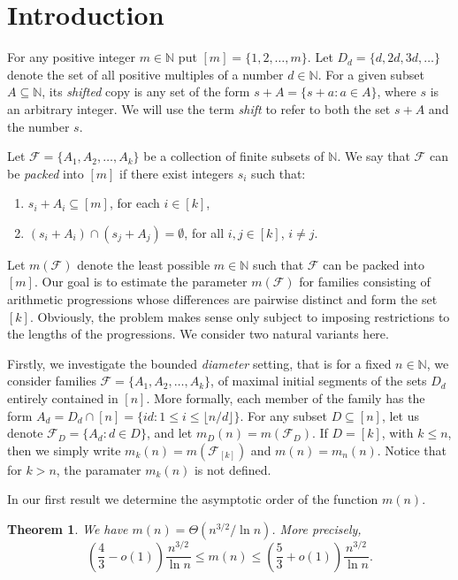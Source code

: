 \documentclass[12pt]{amsart}
\newtheorem{theorem}{Theorem}
\theoremstyle{plain}
\numberwithin{equation}{section}
\begin{document}
	
	\section{Introduction}
For any positive integer $m\in \mathbb{N}$ 
put $[m]=\{1,2,\ldots,m\}$. Let $D_d=\{d,2d,3d,\ldots\}$ denote the set of all positive multiples of a number $d\in \mathbb{N}$. For a given subset $A\subseteq \mathbb{N}$, its \emph{shifted} copy 
is any set of the form $s+A=\{s+a:a\in A\}$, where $s$ is an arbitrary integer. We will use the term \emph{shift} to refer to both the set $s+A$ and the number $s$.

Let $\mathcal{F}=\{A_1,A_2,\ldots,A_k\}$ be a collection of finite subsets of $\mathbb{N}$. We say that $\mathcal{F}$ can be \emph{packed} into $[m]$ if there exist integers $s_i$ such that:
\begin{enumerate}
	\item [(1)]$s_i+A_i\subseteq [m]$, for each $i \in [k]$,
	\item [(2)] $(s_i+A_i)\cap (s_j+A_j)=\emptyset$, for all $i,j \in [k]$, $i\neq j$.
\end{enumerate}

Let $m(\mathcal{F})$ denote the least possible $m\in \mathbb{N}$ such that $\mathcal{F}$ can be packed into $[m]$. Our goal is to estimate the parameter $m(\mathcal{F})$ for families consisting of 
arithmetic progressions whose differences are pairwise distinct and form the set $[k]$.
Obviously, the problem makes sense only subject to imposing restrictions 
to the lengths of the progressions. We consider two natural variants here. 

Firstly, we investigate the bounded \emph{diameter} setting, that is for a fixed $n\in \mathbb{N}$, we consider families $\mathcal{F}=\{A_1,A_2,\ldots,A_k\}$, 
of maximal initial segments of the sets $D_d$ entirely contained in $[n]$.
More formally, each member of the family has the form $A_d=D_d\cap [n]=\{id:1\leqslant i\leqslant \lfloor n/d\rfloor\}$. For any subset $D\subseteq [n]$, let us denote $\mathcal{F}_D=\{A_d:d\in D\}$, and let $m_D(n)=m(\mathcal{F}_D)$. If $D=[k]$, with $k\leqslant n$, then we simply write $m_k(n)=m(\mathcal{F}_{[k]})$ and $m(n)=m_n(n)$. Notice that for $k>n$, the paramater $m_k(n)$ is not defined.

In our first result we determine the asymptotic order of the function $m(n)$.

\begin{theorem} \label{t11}
	We have $m(n)=\Theta(n^{3/2}/\ln n)$. More precisely,
		$$\left(\frac43-o(1)\right) \frac{n^{3/2}}{\ln n} \leqslant  m(n) \leqslant \left(\frac53+o(1)\right)
		\frac{n^{3/2}}{\ln n}.$$
\end{theorem}
\end{document}
